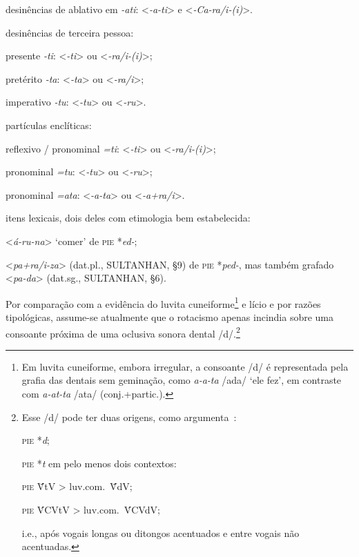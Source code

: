 \begin{compactenum}
	\item desinências de ablativo em \emph{-ati}: <\emph{-a-ti}> e
	<\emph{-Ca-ra\slash{}i-{(i)}}>.
	\item desinências de terceira pessoa:
	\begin{compactenum}
		\item presente \emph{-ti}: <\emph{-ti}> ou <\emph{-ra\slash{}i-{(i)}}>;
		\item pretérito \emph{-ta}: <\emph{-ta}> ou <\emph{-ra\slash{}i}>;
		\item imperativo \emph{-tu}: <\emph{-tu}> ou <\emph{-ru}>.
	\end{compactenum}
	\item partículas enclíticas:
	\begin{compactenum}
		\item reflexivo / pronominal \emph{=ti}: <\emph{-ti}> ou <\emph{-ra\slash{}i-{(i)}}>;
		\item pronominal \emph{=tu}: <\emph{-tu}> ou <\emph{-ru}>;
		\item pronominal \emph{=ata}: <\emph{-a-ta}> ou <\emph{-a+ra\slash{}i}>.
	\end{compactenum}
	\item itens lexicais, dois deles com etimologia bem estabelecida:
	\begin{compactenum}
		\item <\emph{á-ru-na}> `comer' de \textsc{pie} *\emph{ed-};
		\item <\emph{pa+ra\slash{}i-za}> (dat.pl., SULTANHAN, §9) de
		\textsc{pie} *\emph{ped-}, mas também grafado <\emph{pa-da}> (dat.sg.,
		SULTANHAN, §6).
	\end{compactenum}
\end{compactenum}
Por comparação com a evidência do luvita cuneiforme\footnote{Em luvita
	cuneiforme, embora irregular, a consoante /d/ é representada pela grafia das
	dentais sem geminação, como \emph{a-a-ta} /ada/ `ele fez', em contraste com
	\emph{a-at-ta} /ata/ (conj.+partic.).}
e lício e por razões tipológicas, assume-se atualmente que o rotacismo apenas
incindia sobre uma consoante próxima de uma oclusiva sonora dental
/d/.\footnote{Esse /d/ pode ter duas origens, como
	argumenta~\textcite{MorpurgoDavies1982}:
	\begin{inparaenum}
		\item \textsc{pie} *\emph{d};
		\item \textsc{pie} *\emph{t} em pelo menos dois contextos:
		\begin{inparaenum}
			\item \textsc{pie} V̄́tV > luv.com.\ V̄́dV;\@
			\item \textsc{pie} V́CVtV > luv.com.\ V́CVdV;\@
		\end{inparaenum}
	\end{inparaenum}
	i.e., após vogais longas ou ditongos acentuados e entre vogais não acentuadas.
}
